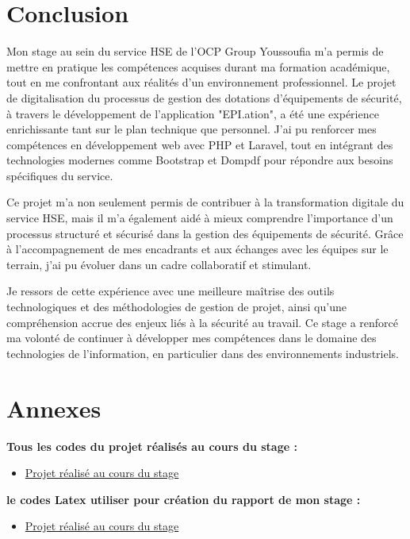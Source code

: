 \documentclass[a4paper,12pt]{report}
\begin{document}
\chapter*{Conclusion}


Mon stage au sein du service HSE de l'OCP Group Youssoufia m’a permis de mettre en pratique les compétences acquises durant ma formation académique, tout en me confrontant aux réalités d’un environnement professionnel. Le projet de digitalisation du processus de gestion des dotations d’équipements de sécurité, à travers le développement de l’application "EPI.ation", a été une expérience enrichissante tant sur le plan technique que personnel. J’ai pu renforcer mes compétences en développement web avec PHP et Laravel, tout en intégrant des technologies modernes comme Bootstrap et Dompdf pour répondre aux besoins spécifiques du service.

Ce projet m'a non seulement permis de contribuer à la transformation digitale du service HSE, mais il m'a également aidé à mieux comprendre l’importance d’un processus structuré et sécurisé dans la gestion des équipements de sécurité. Grâce à l’accompagnement de mes encadrants et aux échanges avec les équipes sur le terrain, j’ai pu évoluer dans un cadre collaboratif et stimulant.

Je ressors de cette expérience avec une meilleure maîtrise des outils technologiques et des méthodologies de gestion de projet, ainsi qu'une compréhension accrue des enjeux liés à la sécurité au travail. Ce stage a renforcé ma volonté de continuer à développer mes compétences dans le domaine des technologies de l’information, en particulier dans des environnements industriels.

\appendix
\chapter*{Annexes}

       \textbf{Tous les codes du projet réalisés au cours du stage :}
       
        \begin{itemize}
        \item \href{https://github.com/ABDOx500/EPI_Intership_1ACI.git}{Projet réalisé au cours du stage}
        \end{itemize}
         \textbf{le codes Latex utiliser pour création du rapport de mon stage :}
         
        \begin{itemize}
        \item \href{}{Projet réalisé au cours du stage}
        \end{itemize}
\end{document}
